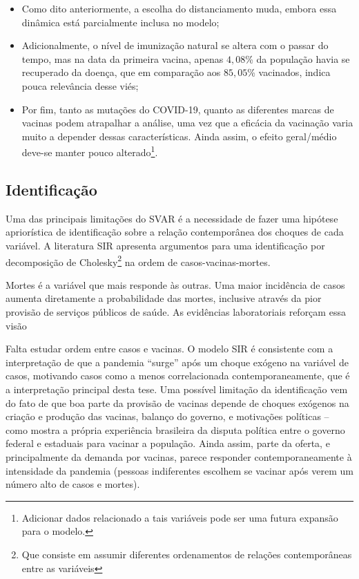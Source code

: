 \documentclass[
    article,
	12pt,				%
	oneside,			%
	a4paper,			%
	english,			%
	brazil,				%
	hyperref = {colorlinks, citecolor=c1d, linkcolor=c2d, urlcolor=c3d, colorlinks}
	]{abntex2}
\begin{document}
\begin{itemize}
    \item Como dito anteriormente, a escolha do distanciamento muda, embora essa dinâmica está parcialmente inclusa no modelo;
    \item Adicionalmente, o nível de imunização natural se altera com o passar do tempo, mas na data da primeira vacina, apenas $4,08$\% da população havia se recuperado da doença, que em comparação aos $85,05$\% vacinados, indica pouca relevância desse viés;
    \item Por fim, tanto as mutações do COVID-19, quanto as diferentes marcas de vacinas podem atrapalhar a análise, uma vez que a eficácia da vacinação varia muito a depender dessas características. Ainda assim, o efeito geral/médio deve-se manter pouco alterado\footnote{Adicionar dados relacionado a tais variáveis pode ser uma futura expansão para o modelo.}.
\end{itemize}


\subsection{Identificação}

Uma das principais limitações do SVAR é a necessidade de fazer uma hipótese apriorística de identificação sobre a relação contemporânea dos choques de cada variável. A literatura SIR apresenta argumentos para uma identificação por decomposição de Cholesky\footnote{Que consiste em assumir diferentes ordenamentos de relações contemporâneas entre as variáveis} na ordem de casos-vacinas-mortes. 

Mortes é a variável que mais responde às outras. Uma maior incidência de casos aumenta diretamente a probabilidade das mortes, inclusive através da pior provisão de serviços públicos de saúde. As evidências laboratoriais reforçam essa visão

Falta estudar ordem entre casos e vacinas. O modelo SIR é consistente com a interpretação de que a pandemia ``surge'' após um choque exógeno na variável de casos, motivando casos como a menos correlacionada contemporaneamente, que é a interpretação principal desta tese. Uma possível limitação da identificação vem do fato de que boa parte da provisão de vacinas depende de choques exógenos na criação e produção das vacinas, balanço do governo, e motivações políticas -- como mostra a própria experiência brasileira da disputa política entre o governo federal e estaduais para vacinar a população. Ainda assim, parte da oferta, e principalmente da demanda por vacinas, parece responder contemporaneamente à intensidade da pandemia (pessoas indiferentes escolhem se vacinar após verem um número alto de casos e mortes).
\end{document}
